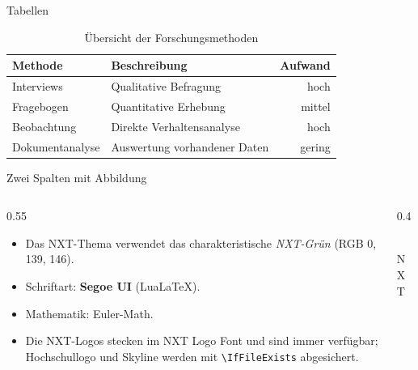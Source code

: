 \documentclass[aspectratio=169]{beamer}
\begin{document}
\begin{frame}{Tabellen}

\begin{table}
  \centering
  \begin{tabular}{llr}
    \toprule
    \textbf{Methode} & \textbf{Beschreibung} & \textbf{Aufwand} \\
    \midrule
    Interviews       & Qualitative Befragung        & hoch   \\
    Fragebogen       & Quantitative Erhebung        & mittel \\
    Beobachtung      & Direkte Verhaltensanalyse    & hoch   \\
    Dokumentanalyse  & Auswertung vorhandener Daten & gering \\
    \bottomrule
  \end{tabular}
  \caption{Übersicht der Forschungsmethoden}
\end{table}

\end{frame}

\begin{frame}{Zwei Spalten mit Abbildung}

\begin{columns}[T]
  \begin{column}{0.55\textwidth}
    \begin{itemize}
      \item Das NXT-Thema verwendet das charakteristische
        \emph{NXT-Grün} (RGB 0, 139, 146).
      \item Schriftart: \textbf{Segoe UI} (LuaLaTeX).
      \item Mathematik: Euler-Math.
      \item Die NXT-Logos stecken im NXT Logo Font und sind immer
        verfügbar; Hochschullogo und Skyline werden mit
        \texttt{\textbackslash IfFileExists} abgesichert.
    \end{itemize}
  \end{column}
  \begin{column}{0.4\textwidth}
    \begin{center}
      \nxtlogo[width=0.7\textwidth]\\[10pt]
      {\color{nxtgreen}\nxtlogofont\LARGE N X T}
    \end{center}
  \end{column}
\end{columns}

\end{frame}
\end{document}
